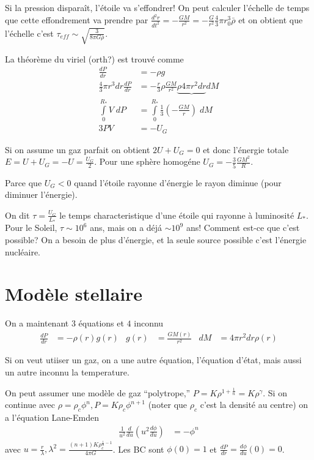 \documentclass[10pt]{report}
\newcommand{\rd}[2]{\frac{d#1}{d#2}}
\newcommand{\rtd}[2]{\frac{d^2#1}{d#2^2}}
\begin{document}
Si la pression dispara\^it, l'\'etoile va s'effondrer! On peut calculer l'\'echelle de temps que cette effondrement va prendre par $\rtd{r}{t} = -\frac{GM}{r^2} = -\frac{G}{r^2}\frac{4}{3}\pi r_0^3 \bar{\rho}$ et on obtient que l'\'echelle c'est $\tau_{eff} \sim \sqrt{\frac{3}{8\pi G\bar{\rho}}}$. 

La th\'eor\`eme du viriel (orth?) est trouv\'e comme
\begin{align}
    \rd{P}{r} &= -\rho g\\
    \frac{4}{3}\pi r^3 dr \rd{P}{r} &= - \frac{r}{3}\rho \frac{GM}{r^2} \underbrace{\rho 4\pi r^2 dr}{dM}\\
    \int\limits_{0}^{R_*}V\;dP &= \int\limits_{0}^{R_*}\frac{1}{3}\left( -\frac{GM}{r} \right)\;dM\\
    3PV &= -U_G
\end{align}

Si on assume un gaz parfait on obtient $2U + U_G = 0$ et donc l'\'energie totale $E = U + U_G = -U = \frac{U_G}{2}$. Pour une sph\`ere homog\'ene $U_G = -\frac{3}{5} \frac{GM^2}{R}$. 

Parce que $U_G < 0$ quand l'\'etoile rayonne d'\'energie le rayon diminue (pour diminuer l'\'energie).

On dit $\tau = \frac{U_G}{L_*}$ le temps characteristique d'une \'etoile qui rayonne \`a luminosit\'e $L_*$. Pour le Soleil, $\tau \sim 10^6$ ans, mais on a d\'ej\'a $\sim10^9$ ans! Comment est-ce que c'est possible? On a besoin de plus d'\'energie, et la seule source possible c'est l'\'energie nucl\'eaire.

\section{Mod\`ele stellaire}

On a maintenant $3$ \'equations et $4$ inconnu
\begin{align}
    \rd{P}{r} &= -\rho(r) g(r) & g(r) &= \frac{GM(r)}{r^2} & dM &= 4\pi r^2 dr \rho(r)
\end{align}

Si on veut utiiser un gaz, on a une autre \'equation, l'\'equation d'\'etat, mais aussi un autre inconnu la temperature.

On peut assumer une mod\`ele de gaz ``polytrope,'' $P = K\rho^{1 + \frac{1}{n}} = K\rho^{\gamma}$. Si on continue avec $\rho = \rho_c \phi^n, P = K\rho_c \phi^{n+1}$ (noter que $\rho_c$ c'est la densit\'e au centre) on a l'\'equation Lane-Emden
\begin{align}
    \frac{1}{u^2}\rd{}{u}\left( u^2\rd{\phi}{u} \right) &= -\phi^n
\end{align}
avec $u = \frac{r}{\lambda}, \lambda^2 = \frac{(n+1)K\rho_c^{\frac{1}{n} - 1}}{4\pi G}$. Les BC sont $\phi(0) = 1$ et $\rd{P}{r} = \rd{\phi}{u}(0) = 0$. 
\end{document}

